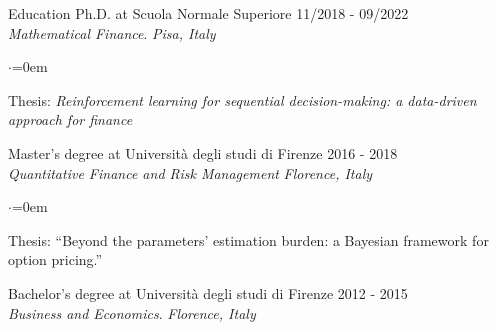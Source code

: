 \documentclass{resume} %
\begin{document}
\begin{rSection}{Education}
{ Ph.D. at Scuola Normale Superiore } \hfill {11/2018 - 09/2022} \\
\emph{Mathematical Finance}. \hfill {\em Pisa, Italy}
\begin{list}{$\cdot$}{\leftmargin=0em}
\item Thesis: \textit{Reinforcement learning for sequential decision-making: a data-driven approach for finance}
\end{list}

{ Master's degree at Università degli studi di Firenze} \hfill {2016 - 2018} \\
\emph{Quantitative Finance and Risk Management} \hfill {\em Florence, Italy}
\begin{list}{$\cdot$}{\leftmargin=0em}
\item Thesis: ``Beyond the parameters' estimation burden: a Bayesian framework for option pricing.''
\end{list}

\vspace{0.5em}

{Bachelor's degree at Università degli studi di Firenze} \hfill {2012 - 2015} \\
\emph{Business and Economics}. \hfill {\em Florence, Italy}

\end{rSection}
\end{document}
